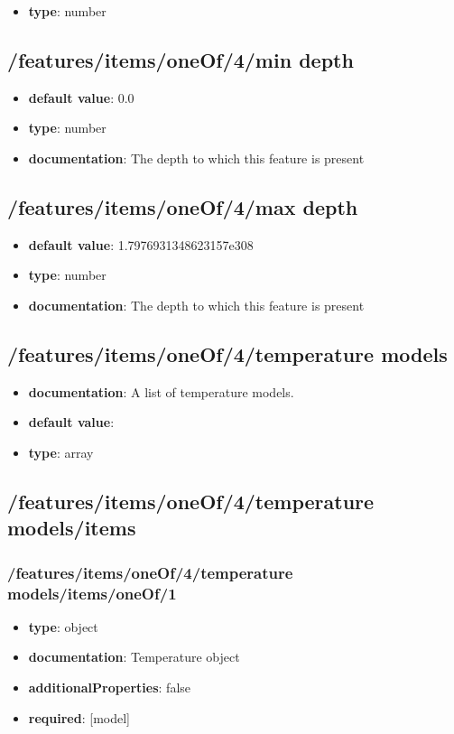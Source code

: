 \begin{itemize}\item {\bf type}: number
\end{itemize}\subsection{/features/items/oneOf/4/min depth}
\begin{itemize}\item {\bf default value}: 0.0
\item {\bf type}: number
\item {\bf documentation}: The depth to which this feature is present
\end{itemize}\subsection{/features/items/oneOf/4/max depth}
\begin{itemize}\item {\bf default value}: 1.7976931348623157e308
\item {\bf type}: number
\item {\bf documentation}: The depth to which this feature is present
\end{itemize}\subsection{/features/items/oneOf/4/temperature models}
\begin{itemize}\item {\bf documentation}: A list of temperature models.
\item {\bf default value}: 
\item {\bf type}: array
\end{itemize}\subsection{/features/items/oneOf/4/temperature models/items}

\subsubsection{/features/items/oneOf/4/temperature models/items/oneOf/1}
\begin{itemize}\item {\bf type}: object
\item {\bf documentation}: Temperature object
\item {\bf additionalProperties}: false
\item {\bf required}: [model]\end{itemize}
